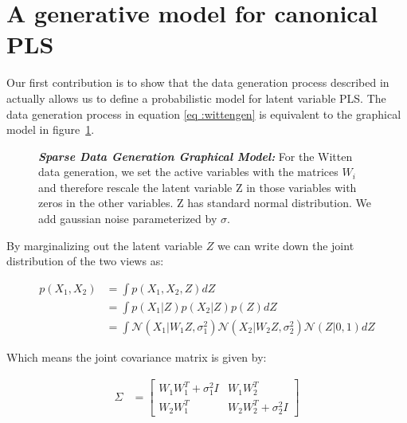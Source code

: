 \section{A generative model for canonical PLS}\label{subsec:a-generative-model-for-canonical-pls}

Our first contribution is to show that the data generation process described in~\cite{witten2009extensions} actually
allows us to define a probabilistic model for latent variable PLS. The data generation process in equation \ref{eq
:wittengen} is equivalent to the graphical model in figure~\ref{fig:wittengraphical}.

\begin{figure}
\centering
 \caption[Sparse Data Generation Graphical Model]{\textit{\textbf{Sparse Data Generation Graphical Model: }}For the Witten data generation, we set the active variables with the matrices $W_i$ and therefore rescale the latent variable Z in those variables with zeros in the other variables. Z has standard normal distribution. We add gaussian noise parameterized by $\sigma$.}
 \label{fig:wittengraphical}
\end{figure}

By marginalizing out the latent variable $Z$ we can write down the joint distribution of the two views as:

\begin{align}
    p(X_1,X_2) &= \int p(X_1,X_2,Z) dZ \\
    &= \int p(X_1|Z)p(X_2|Z)p(Z) dZ \\
    &= \int \mathcal{N}(X_1|W_1Z,\sigma_1^2) \mathcal{N}(X_2|W_2Z,\sigma_2^2) \mathcal{N}(Z|0,1) dZ
\end{align}

Which means the joint covariance matrix is given by:

\begin{align}
    \Sigma &= \begin{bmatrix}
        W_1W_1^T + \sigma_1^2I & W_1W_2^T \\
        W_2W_1^T & W_2W_2^T + \sigma_2^2I
    \end{bmatrix}
\end{align}

